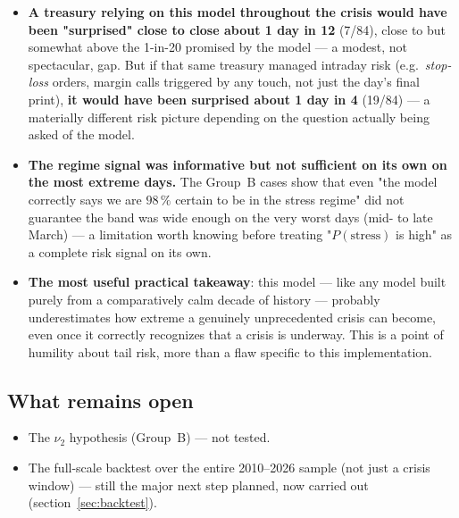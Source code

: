 \documentclass[12pt,a4paper]{article}
\begin{document}
	\begin{econbox}
		\begin{itemize}
			\item \textbf{A treasury relying on this model throughout the
				crisis would have been "surprised" close to close
				about 1 day in 12} (7/84), close to but somewhat above
			the 1-in-20 promised by the model --- a modest, not
			spectacular, gap. But if that same treasury managed
			intraday risk (e.g.\ \emph{stop-loss} orders, margin
			calls triggered by any touch, not just the day's final
			print), \textbf{it would have been surprised about 1 day in 4}
			(19/84) --- a materially different risk picture depending on
			the question actually being asked of the model.
			\item \textbf{The regime signal was informative but not
				sufficient on its own on the most extreme days.} The
			Group~B cases show that even "the model correctly
			says we are $98\,\%$ certain to be in the stress
			regime" did not guarantee the band was wide enough on
			the very worst days (mid- to late March) --- a limitation
			worth knowing before treating
			"$P(\text{stress})$ is high" as a complete risk signal
			on its own.
			\item \textbf{The most useful practical takeaway}: this
			model --- like any model built purely from
			a comparatively calm decade of history --- probably underestimates
			how extreme a genuinely unprecedented crisis can become,
			even once it correctly recognizes that a crisis is
			underway. This is a point of humility about tail risk,
			more than a flaw specific to this implementation.
		\end{itemize}
	\end{econbox}
	
	\subsection{What remains open}
	
	\begin{itemize}
		\item The $\nu_2$ hypothesis (Group~B) --- not tested.
		\item The full-scale backtest over the entire 2010--2026
		sample (not just a crisis window) --- still
		the major next step planned, now carried out
		(section~\ref{sec:backtest}).
	\end{itemize}
	
	\newpage
	
\end{document}
